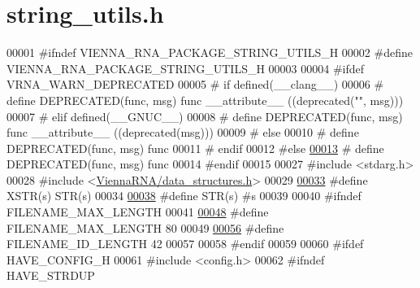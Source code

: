 \hypertarget{string__utils_8h_source}{}\section{string\+\_\+utils.\+h}
\label{string__utils_8h_source}

\begin{DoxyCode}
00001 \textcolor{preprocessor}{#ifndef VIENNA\_RNA\_PACKAGE\_STRING\_UTILS\_H}
00002 \textcolor{preprocessor}{#define VIENNA\_RNA\_PACKAGE\_STRING\_UTILS\_H}
00003 
00004 \textcolor{preprocessor}{#ifdef VRNA\_WARN\_DEPRECATED}
00005 \textcolor{preprocessor}{# if defined(\_\_clang\_\_)}
00006 \textcolor{preprocessor}{#  define DEPRECATED(func, msg) func \_\_attribute\_\_ ((deprecated("", msg)))}
00007 \textcolor{preprocessor}{# elif defined(\_\_GNUC\_\_)}
00008 \textcolor{preprocessor}{#  define DEPRECATED(func, msg) func \_\_attribute\_\_ ((deprecated(msg)))}
00009 \textcolor{preprocessor}{# else}
00010 \textcolor{preprocessor}{#  define DEPRECATED(func, msg) func}
00011 \textcolor{preprocessor}{# endif}
00012 \textcolor{preprocessor}{#else}
\mbox{\hyperlink{string__utils_8h_aab347a3c03fbe8e7319551b9fa0cce4a}{00013}} \textcolor{preprocessor}{# define DEPRECATED(func, msg) func}
00014 \textcolor{preprocessor}{#endif}
00015 
00027 \textcolor{preprocessor}{#include <stdarg.h>}
00028 \textcolor{preprocessor}{#include <\mbox{\hyperlink{data__structures_8h}{ViennaRNA/data\_structures.h}}>}
00029 
\mbox{\hyperlink{group__string__utils_ga03943706e48069237cd57f2d35ca987e}{00033}} \textcolor{preprocessor}{#define XSTR(s) STR(s)}
00034 
\mbox{\hyperlink{group__string__utils_ga6388870e639eee9c0a69446876f1f8cc}{00038}} \textcolor{preprocessor}{#define STR(s) #s}
00039 
00040 \textcolor{preprocessor}{#ifndef FILENAME\_MAX\_LENGTH}
00041 
\mbox{\hyperlink{group__string__utils_gafb228174279df9486a5cb56ac0bc79a3}{00048}} \textcolor{preprocessor}{#define FILENAME\_MAX\_LENGTH   80}
00049 
\mbox{\hyperlink{group__string__utils_ga33c3b1826b8e2739f09f111ec719ded5}{00056}} \textcolor{preprocessor}{#define FILENAME\_ID\_LENGTH    42}
00057 
00058 \textcolor{preprocessor}{#endif}
00059 
00060 \textcolor{preprocessor}{#ifdef HAVE\_CONFIG\_H}
00061 \textcolor{preprocessor}{#include <config.h>}
00062 \textcolor{preprocessor}{#ifndef HAVE\_STRDUP}

\end{DoxyCode}

